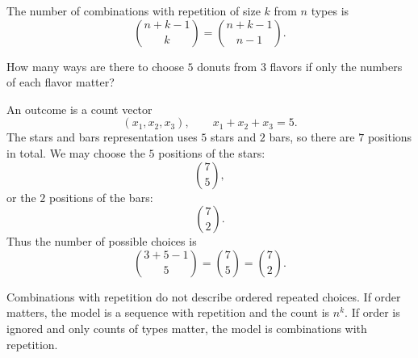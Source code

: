 \begin{theorembox}
The number of combinations with repetition of size \(k\) from \(n\) types is
\[
\binom{n+k-1}{k}=\binom{n+k-1}{n-1}.
\]
\end{theorembox}

\begin{examplebox}
How many ways are there to choose \(5\) donuts from \(3\) flavors if only the numbers of each flavor matter?

An outcome is a count vector
\[
(x_1,x_2,x_3),\qquad x_1+x_2+x_3=5.
\]
The stars and bars representation uses \(5\) stars and \(2\) bars, so there are \(7\) positions in total. We may choose the \(5\) positions of the stars:
\[
\binom{7}{5},
\]
or the \(2\) positions of the bars:
\[
\binom{7}{2}.
\]
Thus the number of possible choices is
\[
\binom{3+5-1}{5}=\binom{7}{5}=\binom{7}{2}.
\]
\end{examplebox}

\begin{remarkbox}
Combinations with repetition do not describe ordered repeated choices. If order matters, the model is a sequence with repetition and the count is \(n^k\). If order is ignored and only counts of types matter, the model is combinations with repetition.
\end{remarkbox}
